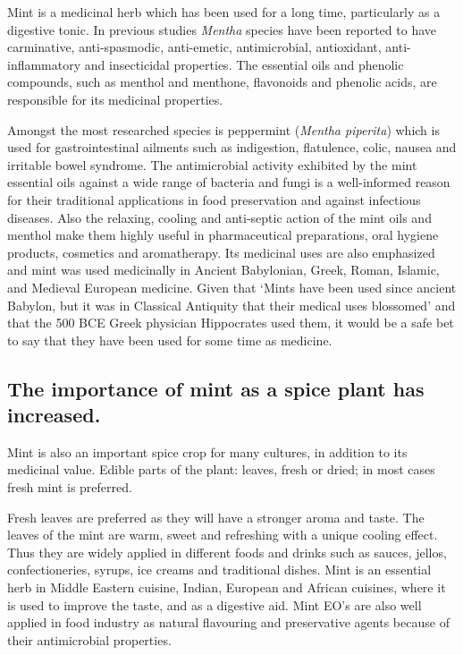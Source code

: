 Mint is a medicinal herb which has been used for a long time, particularly as a digestive tonic. In previous studies \textit{Mentha} species have been reported to have carminative, anti-spasmodic, anti-emetic, antimicrobial, antioxidant, anti-inflammatory and insecticidal properties. The essential oils and phenolic compounds, such as menthol and menthone, flavonoids and phenolic acids, are responsible for its medicinal properties.

Amongst the most researched species is peppermint (\textit{Mentha piperita}) which is used for gastrointestinal ailments such as indigestion, flatulence, colic, nausea and irritable bowel syndrome. The antimicrobial activity exhibited by the mint essential oils against a wide range of bacteria and fungi is a well-informed reason for their traditional applications in food preservation and against infectious diseases. Also the relaxing, cooling and anti-septic action of the mint oils and menthol make them highly useful in pharmaceutical preparations, oral hygiene products, cosmetics and aromatherapy. Its medicinal uses are also emphasized and mint was used medicinally in Ancient Babylonian, Greek, Roman, Islamic, and Medieval European medicine. Given that `Mints have been used since ancient Babylon, but it was in Classical Antiquity that their medical uses blossomed' \parencite{Silva2020} and that the 500 BCE Greek physician Hippocrates used them, it would be a safe bet to say that they have been used for some time as medicine.

\subsection{The importance of mint as a spice plant has increased.}

Mint is also an important spice crop for many cultures, in addition to its medicinal value. Edible parts of the plant: leaves, fresh or dried; in most cases fresh mint is preferred.

Fresh leaves are preferred as they will have a stronger aroma and taste. The leaves of the mint are warm, sweet and refreshing with a unique cooling effect. Thus they are widely applied in different foods and drinks such as sauces, jellos, confectioneries, syrups, ice creams and traditional dishes. Mint is an essential herb in Middle Eastern cuisine, Indian, European and African cuisines, where it is used to improve the taste, and as a digestive aid. Mint EO's are also well applied in food industry as natural flavouring and preservative agents because of their antimicrobial properties.

